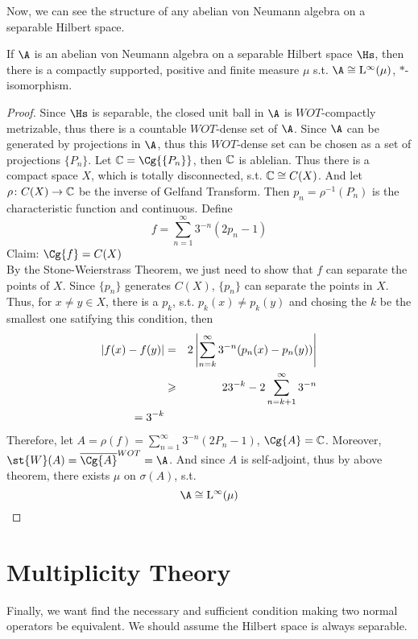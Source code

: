 Now, we can see the structure of any abelian von Neumann algebra on a separable Hilbert space.
\begin{thm}
	If $\A$ is an abelian von Neumann algebra on a separable Hilbert space $\Hs$, then there is a compactly supported, positive and finite measure $\mu$ s.t. $\A \cong \lfs{\infty}(\mu)$, $*$-isomorphism.
\end{thm}
\begin{proof}
	Since $\Hs$ is separable, the closed unit ball in $\A$ is $WOT$-compactly metrizable, thus there is a countable $WOT$-dense set of $\A$. Since $\A$ can be generated by projections in $\A$, thus this $WOT$-dense set can be chosen as a set of projections $\{P_n\}$. Let $\C = \Cg{\{P_n\}}$, then $\mathbb{C}$ is ablelian. Thus there is a compact space $X$, which is totally disconnected, s.t. $\mathbb{C} \cong C(X)$. And let $\rho \colon C(X) \rightarrow \mathbb{C}$ be the inverse of Gelfand Transform. Then $p_n = \rho^{-1}(P_n)$ is the characteristic function and continuous. Define
	\begin{equation*}
		f = \sum_{n=1}^{\infty} 3^{-n}(2p_n - 1)
	\end{equation*}
	Claim: $\Cg{f} = C(X)$ \\
	By the Stone-Weierstrass Theorem, we just need to show that $f$ can separate the points of $X$. Since $\{p_n\}$ generates $C(X)$, $\{p_n\}$ can separate the points in $X$. Thus, for $x \neq y \in X$, there is a $p_k$, s.t. $p_k(x) \neq p_k(y)$ and chosing the $k$ be the smallest one satifying this condition, then
	\begin{eqnarray*}
		\left\lvert f(x)-f(y)\right\lvert &=& 2 \left\lvert\sum_{n=k}^{\infty} 3^{-n}(p_n(x) - p_n(y))\right\lvert \\
		&\geqslant& 2 3^{-k} - 2 \sum_{n=k+1}^{\infty} 3^{-n} \\
		= 3^{-k}
	\end{eqnarray*}
	Therefore, let $A = \rho(f) = \sum_{n=1}^{\infty} 3^{-n}(2P_n - 1)$, $\Cg{A} = \C$. Moreover, $\st{W}(A) = \clo{\Cg{A}}^{WOT} = \A$. And since $A$ is self-adjoint, thus by above theorem, there exists $\mu$ on $\sigma(A)$, s.t.
	\begin{equation*}
		\A \cong \lfs{\infty}(\mu) \qedhere
	\end{equation*}
\end{proof}

\section{Multiplicity Theory}

Finally, we want find the necessary and sufficient condition making two normal operators be equivalent. We should assume the Hilbert space is always separable.

